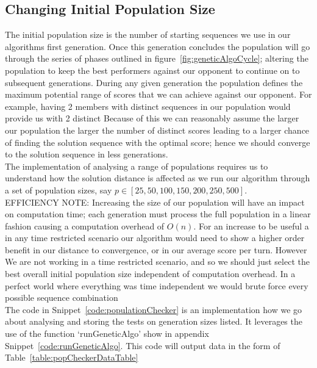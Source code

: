 \subsection{Changing Initial Population Size}\label{subsec:changinginitialpopulationsize}
The initial population size is the number of starting sequences we use in our algorithms first generation.
Once this generation concludes the population will go through the series of phases outlined in figure~\ref{fig:geneticAlgoCycle}; altering the population to keep the best performers against our opponent to continue on to subsequent generations.
During any given generation the population defines the maximum potential range of scores that we can achieve against our opponent.
For example, having 2 members with distinct sequences in our population would provide us with 2 distinct
Because of this we can reasonably assume the larger our population the larger the number of distinct scores leading to a larger chance of finding the solution sequence with the optimal score;
hence we should converge to the solution sequence in less generations.\\

The implementation of analysing a range of populations requires us to understand how the solution distance is affected as we run our algorithm through a set of population sizes, say \(p \in [25,50,100,150,200,250,500]\).\\

EFFICIENCY NOTE\@: Increasing the size of our population will have an impact on computation time;
each generation must process the full population in a linear fashion causing a computation overhead of \(O(n)\).
For an increase to be useful a in any time restricted scenario our algorithm would need to show a higher order benefit in our distance to convergence, or in our average score per turn.
However We are not working in a time restricted scenario, and so we should just select the best overall initial population size independent of computation overhead.
In a perfect world where everything was time independent we would brute force every possible sequence combination\\

The code in Snippet~\ref{code:populationChecker} is an implementation how we go about analysing and storing the tests on generation sizes listed.
It leverages the use of the function `runGeneticAlgo' show in appendix Snippet~\ref{code:runGeneticAlgo}.
This code will output data in the form of Table~\ref{table:popCheckerDataTable}
\\

